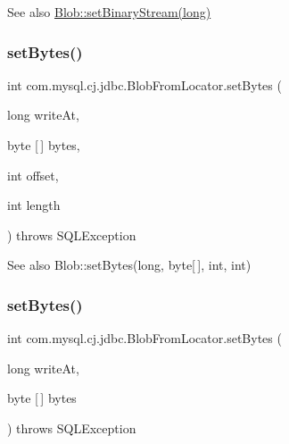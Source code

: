 \begin{DoxySeeAlso}{See also}
\mbox{\hyperlink{classcom_1_1mysql_1_1cj_1_1jdbc_1_1_blob_abbef32522fa0951a0e417442c36ff0b1}{Blob\+::set\+Binary\+Stream(long)}} 
\end{DoxySeeAlso}
\mbox{\label{classcom_1_1mysql_1_1cj_1_1jdbc_1_1_blob_from_locator_a87f6620378f2f7781c3d2ae4f7cca68e}} 
\subsubsection{\texorpdfstring{set\+Bytes()}{setBytes()}\hspace{0.1cm}{\footnotesize\ttfamily [1/2]}}
{\footnotesize\ttfamily int com.\+mysql.\+cj.\+jdbc.\+Blob\+From\+Locator.\+set\+Bytes (\begin{DoxyParamCaption}\item[{long}]{write\+At,  }\item[{byte \mbox{[}$\,$\mbox{]}}]{bytes,  }\item[{int}]{offset,  }\item[{int}]{length }\end{DoxyParamCaption}) throws S\+Q\+L\+Exception}

\begin{DoxySeeAlso}{See also}
Blob\+::set\+Bytes(long, byte\mbox{[}$\,$\mbox{]}, int, int) 
\end{DoxySeeAlso}
\mbox{\label{classcom_1_1mysql_1_1cj_1_1jdbc_1_1_blob_from_locator_a738e1fc68ebb03c3bd2f533930616d69}} 
\subsubsection{\texorpdfstring{set\+Bytes()}{setBytes()}\hspace{0.1cm}{\footnotesize\ttfamily [2/2]}}
{\footnotesize\ttfamily int com.\+mysql.\+cj.\+jdbc.\+Blob\+From\+Locator.\+set\+Bytes (\begin{DoxyParamCaption}\item[{long}]{write\+At,  }\item[{byte \mbox{[}$\,$\mbox{]}}]{bytes }\end{DoxyParamCaption}) throws S\+Q\+L\+Exception}

